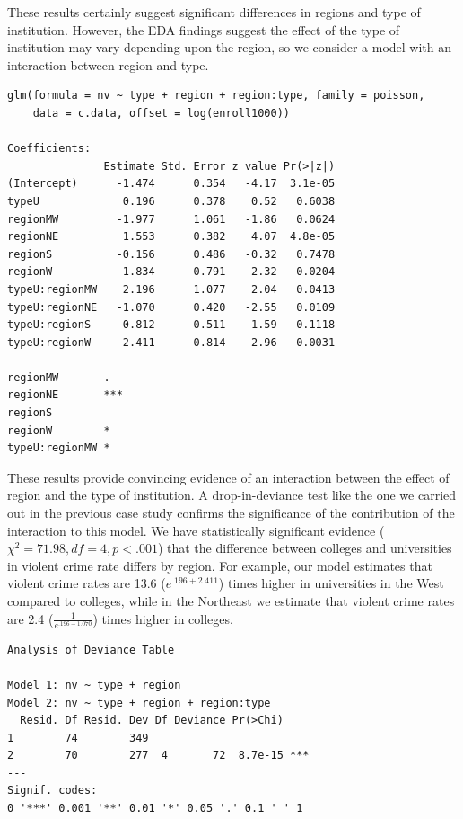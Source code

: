 \documentclass[
]{krantz}
\begin{document}
These results certainly suggest significant differences in regions and type of institution. However, the EDA findings suggest the effect of the type of institution may vary depending upon the region, so we consider a model with an interaction between region and type.

\begin{verbatim}
glm(formula = nv ~ type + region + region:type, family = poisson, 
    data = c.data, offset = log(enroll1000))

Coefficients:
               Estimate Std. Error z value Pr(>|z|)
(Intercept)      -1.474      0.354   -4.17  3.1e-05
typeU             0.196      0.378    0.52   0.6038
regionMW         -1.977      1.061   -1.86   0.0624
regionNE          1.553      0.382    4.07  4.8e-05
regionS          -0.156      0.486   -0.32   0.7478
regionW          -1.834      0.791   -2.32   0.0204
typeU:regionMW    2.196      1.077    2.04   0.0413
typeU:regionNE   -1.070      0.420   -2.55   0.0109
typeU:regionS     0.812      0.511    1.59   0.1118
typeU:regionW     2.411      0.814    2.96   0.0031
                  
regionMW       .  
regionNE       ***
regionS           
regionW        *  
typeU:regionMW *  
\end{verbatim}

These results provide convincing evidence of an interaction between the effect of region and the type of institution. A drop-in-deviance test like the one we carried out in the previous case study confirms the significance of the contribution of the interaction to this model. We have statistically significant evidence (\(\chi^2=71.98, df=4, p<.001\)) that the difference between colleges and universities in violent crime rate differs by region. For example, our model estimates that violent crime rates are 13.6 (\(e^{.196+2.411}\)) times higher in universities in the West compared to colleges, while in the Northeast we estimate that violent crime rates are 2.4 (\(\frac{1}{e^{.196-1.070}}\)) times higher in colleges.

\begin{verbatim}
Analysis of Deviance Table

Model 1: nv ~ type + region
Model 2: nv ~ type + region + region:type
  Resid. Df Resid. Dev Df Deviance Pr(>Chi)    
1        74        349                         
2        70        277  4       72  8.7e-15 ***
---
Signif. codes:  
0 '***' 0.001 '**' 0.01 '*' 0.05 '.' 0.1 ' ' 1
\end{verbatim}
\end{document}
